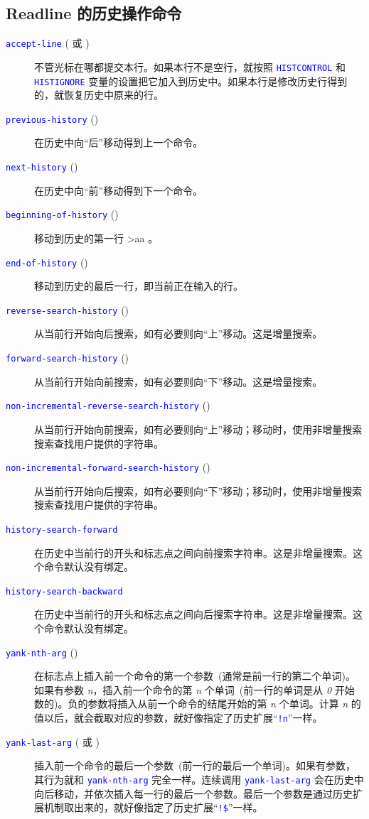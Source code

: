 \documentclass[openany,notitlepage]{book}
\newcommand{\code}[1]{\textcolor{blue}{{\tt #1}}}
\newcommand{\hl}[1]{{\sl #1}}
\begin{document}
\begin{CJK}{UTF8}{song}
\subsection{Readline 的历史操作命令} %
\begin{description}
    \item[\code{accept-line} ( 或 )] 不管光标在哪都提交本行。如果本行不是空行，就按照 \code{HISTCONTROL} 和 \code{HISTIGNORE} 变量的设置把它加入到历史中。如果本行是修改历史行得到的，就恢复历史中原来的行。
    \item[\code{previous-history} ()] 在历史中向``后''移动得到上一个命令。
    \item[\code{next-history} ()] 在历史中向``前''移动得到下一个命令。
    \item[\code{beginning-of-history} ()] 移动到历史的第一行 >aa 。
    \item[\code{end-of-history} ()] 移动到历史的最后一行，即当前正在输入的行。
    \item[\code{reverse-search-history} ()] 从当前行开始向后搜索，如有必要则向``上''移动。这是增量搜索。
    \item[\code{forward-search-history} ()] 从当前行开始向前搜索，如有必要则向``下''移动。这是增量搜索。
    \item[\code{non-incremental-reverse-search-history} ()] 从当前行开始向前搜索，如有必要则向``上''移动；移动时，使用非增量搜索搜索查找用户提供的字符串。
    \item[\code{non-incremental-forward-search-history} ()] 从当前行开始向后搜索，如有必要则向``下''移动；移动时，使用非增量搜索搜索查找用户提供的字符串。
    \item[\code{history-search-forward}] 在历史中当前行的开头和标志点之间向前搜索字符串。这是非增量搜索。这个命令默认没有绑定。
    \item[\code{history-search-backward}] 在历史中当前行的开头和标志点之间向后搜索字符串。这是非增量搜索。这个命令默认没有绑定。
    \item[\code{yank-nth-arg} ()] 在标志点上插入前一个命令的第一个参数~(通常是前一行的第二个单词)。如果有参数 \hl{n}，插入前一个命令的第 \hl{n} 个单词~(前一行的单词是从 \hl{0} 开始数的)。负的参数将插入从前一个命令的结尾开始的第 \hl{n} 个单词。计算 \hl{n} 的值以后，就会截取对应的参数，就好像指定了历史扩展``\code{!n}''一样。
    \item[\code{yank-last-arg} ( 或 )] 插入前一个命令的最后一个参数~(前一行的最后一个单词)。如果有参数，其行为就和 \code{yank-nth-arg} 完全一样。连续调用 \code{yank-last-arg} 会在历史中向后移动，并依次插入每一行的最后一个参数。最后一个参数是通过历史扩展机制取出来的，就好像指定了历史扩展``\code{!\$}''一样。
\end{description}


\end{CJK}
\end{document}

